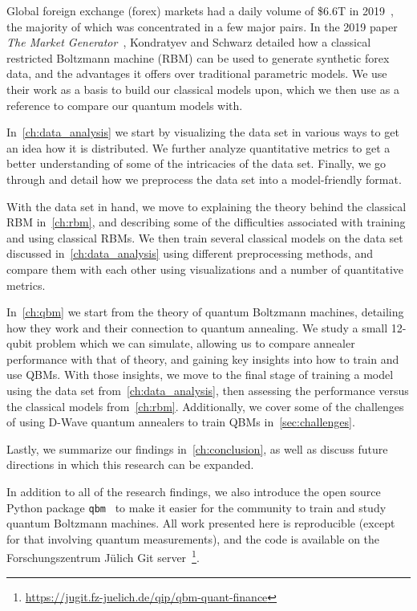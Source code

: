 Global foreign exchange (forex) markets had a daily volume of \$6.6T in 2019~\cite{bis_2019}, the majority of which was concentrated in a few major pairs.
In the 2019 paper \textit{The Market Generator}~\cite{kondratyev_2019}, Kondratyev and Schwarz detailed how a classical restricted Boltzmann machine (RBM) can be used to generate synthetic forex data, and the advantages it offers over traditional parametric models.
We use their work as a basis to build our classical models upon, which we then use as a reference to compare our quantum models with.

In~\cref{ch:data_analysis} we start by visualizing the data set in various ways to get an idea how it is distributed.
We further analyze quantitative metrics to get a better understanding of some of the intricacies of the data set.
Finally, we go through and detail how we preprocess the data set into a model-friendly format.

With the data set in hand, we move to explaining the theory behind the classical RBM in~\cref{ch:rbm}, and describing some of the difficulties associated with training and using classical RBMs.
We then train several classical models on the data set discussed in~\cref{ch:data_analysis} using different preprocessing methods, and compare them with each other using visualizations and a number of quantitative metrics.

In~\cref{ch:qbm} we start from the theory of quantum Boltzmann machines, detailing how they work and their connection to quantum annealing.
We study a small 12-qubit problem which we can simulate, allowing us to compare annealer performance with that of theory, and gaining key insights into how to train and use QBMs.
With those insights, we move to the final stage of training a model using the data set from~\cref{ch:data_analysis}, then assessing the performance versus the classical models from~\cref{ch:rbm}.
Additionally, we cover some of the challenges of using D-Wave quantum annealers to train QBMs in~\cref{sec:challenges}.

Lastly, we summarize our findings in~\cref{ch:conclusion}, as well as discuss future directions in which this research can be expanded.

In addition to all of the research findings, we also introduce the open source Python package \texttt{qbm}~\cite{qbm} to make it easier for the community to train and study quantum Boltzmann machines.
All work presented here is reproducible (except for that involving quantum measurements), and the code is available on the Forschungszentrum J\"ulich Git server~\footnote{\url{https://jugit.fz-juelich.de/qip/qbm-quant-finance}}.
